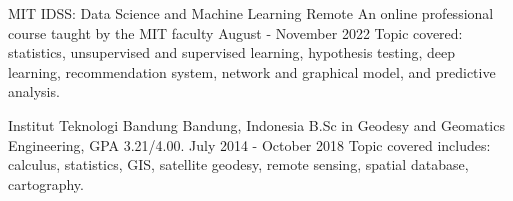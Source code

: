 \resumeSubheading
{MIT IDSS: Data Science and Machine Learning}
{Remote}
{An online professional course taught by the MIT faculty}
{August - November 2022}
\small{Topic covered: statistics, unsupervised and supervised learning, hypothesis testing, 
deep learning, recommendation system, network and graphical model, and predictive 
analysis.}

\vspace{5pt}
\resumeSubheading
{Institut Teknologi Bandung}
{Bandung, Indonesia}
{B.Sc in Geodesy and Geomatics Engineering, GPA 3.21/4.00.}
{July 2014 - October 2018}
\small{Topic covered includes: calculus, statistics, GIS, satellite geodesy, 
remote sensing, spatial database, cartography.}
